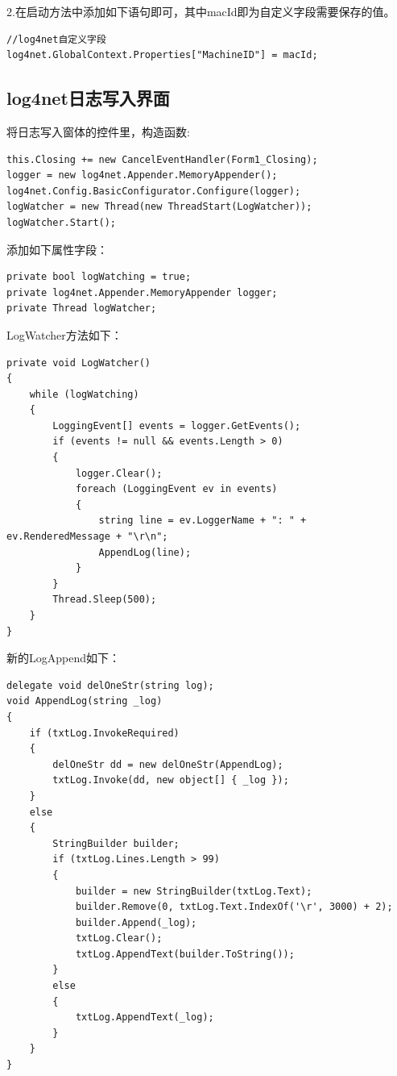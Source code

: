 \documentclass{book}
\begin{document}
2.在启动方法中添加如下语句即可，其中macId即为自定义字段需要保存的值。
\begin{lstlisting}
//log4net自定义字段
log4net.GlobalContext.Properties["MachineID"] = macId;
\end{lstlisting}

\subsection{log4net日志写入界面}

将日志写入窗体的控件里，构造函数:
\begin{lstlisting}[language={[Sharp]C}]
this.Closing += new CancelEventHandler(Form1_Closing);
logger = new log4net.Appender.MemoryAppender();
log4net.Config.BasicConfigurator.Configure(logger);
logWatcher = new Thread(new ThreadStart(LogWatcher));
logWatcher.Start();
\end{lstlisting}

添加如下属性字段：
\begin{lstlisting}[language={[Sharp]C}]
private bool logWatching = true;
private log4net.Appender.MemoryAppender logger;
private Thread logWatcher;
\end{lstlisting}

LogWatcher方法如下：
\begin{lstlisting}[language={[Sharp]C}]
private void LogWatcher()
{
    while (logWatching)
    {
        LoggingEvent[] events = logger.GetEvents();
        if (events != null && events.Length > 0)
        {
            logger.Clear();
            foreach (LoggingEvent ev in events)
            {
                string line = ev.LoggerName + ": " + ev.RenderedMessage + "\r\n";
                AppendLog(line);
            }
        }
        Thread.Sleep(500);
    }
}        
\end{lstlisting}

新的LogAppend如下：
\begin{lstlisting}[language={[Sharp]C}]
delegate void delOneStr(string log);
void AppendLog(string _log)
{
    if (txtLog.InvokeRequired)
    {
        delOneStr dd = new delOneStr(AppendLog);
        txtLog.Invoke(dd, new object[] { _log });
    }
    else
    {
        StringBuilder builder;
        if (txtLog.Lines.Length > 99)
        {
            builder = new StringBuilder(txtLog.Text);
            builder.Remove(0, txtLog.Text.IndexOf('\r', 3000) + 2);
            builder.Append(_log);
            txtLog.Clear();
            txtLog.AppendText(builder.ToString());
        }
        else
        {
            txtLog.AppendText(_log);
        }
    }
}
\end{lstlisting}
\end{document}
